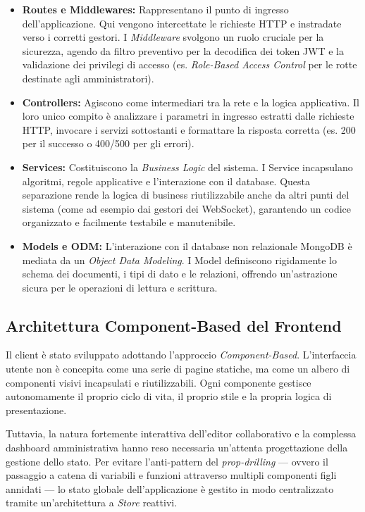 \documentclass[11pt,a4paper]{report}
\begin{document}
\begin{itemize}
    \item \textbf{Routes e Middlewares:} Rappresentano il punto di ingresso dell'applicazione. Qui vengono intercettate le richieste HTTP e instradate verso i corretti gestori. I \textit{Middleware} svolgono un ruolo cruciale per la sicurezza, agendo da filtro preventivo per la decodifica dei token JWT e la validazione dei privilegi di accesso (es. \textit{Role-Based Access Control} per le rotte destinate agli amministratori).
    \item \textbf{Controllers:} Agiscono come intermediari tra la rete e la logica applicativa. Il loro unico compito è analizzare i parametri in ingresso estratti dalle richieste HTTP, invocare i servizi sottostanti e formattare la risposta corretta (es. 200 per il successo o 400/500 per gli errori).
    \item \textbf{Services:} Costituiscono la \textit{Business Logic} del sistema. I Service incapsulano algoritmi, regole applicative e l'interazione con il database. Questa separazione rende la logica di business riutilizzabile anche da altri punti del sistema (come ad esempio dai gestori dei WebSocket), garantendo un codice organizzato e facilmente testabile e manutenibile.
    \item \textbf{Models e ODM:} L'interazione con il database non relazionale MongoDB è mediata da un \textit{Object Data Modeling}. I Model definiscono rigidamente lo schema dei documenti, i tipi di dato e le relazioni, offrendo un'astrazione sicura per le operazioni di lettura e scrittura.
\end{itemize}

\subsection{Architettura Component-Based del Frontend}
Il client è stato sviluppato adottando l'approccio \textit{Component-Based}. L'interfaccia utente non è concepita come una serie di pagine statiche, ma come un albero di componenti visivi incapsulati e riutilizzabili. Ogni componente gestisce autonomamente il proprio ciclo di vita, il proprio stile e la propria logica di presentazione.

Tuttavia, la natura fortemente interattiva dell'editor collaborativo e la complessa dashboard amministrativa hanno reso necessaria un'attenta progettazione della gestione dello stato. Per evitare l'anti-pattern del \textit{prop-drilling} --- ovvero il passaggio a catena di variabili e funzioni attraverso multipli componenti figli annidati --- lo stato globale dell'applicazione è gestito in modo centralizzato tramite un'architettura a \textit{Store} reattivi.
\end{document}
